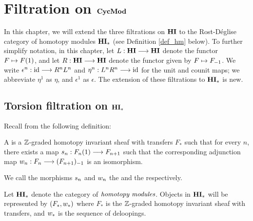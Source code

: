 \newpage
\chapter{Filtration on $\mathbf{CycMod}$}\label{sect_filtration_cycmod}

In this chapter, we will extend the three filtrations on
$\mathbf{HI}$ to the Rost-D\'eglise category of homotopy modules $\mathbf{HI}_*$ 
(see Definition \ref{def_hm} below). To further simplify notation, 
in this chapter, let $L: \mathbf{HI} \longrightarrow \mathbf{HI}$ denote the functor $F 
\mapsto F(1)$, and let $R: \mathbf{HI} \longrightarrow \mathbf{HI}$ denote the functor 
given by $F \mapsto F_{-1}$. We write $\epsilon^n : \mathrm{id} \longrightarrow 
R^nL^n$ and $\eta^n: L^nR^n \longrightarrow \mathrm{id}$ for the unit and counit maps; 
we abbreviate $\eta^1$ as $\eta$, and $\epsilon^1$ as $\epsilon$.
The extension of these filtrations to $\mathbf{HI}_*$ is new.

\section{Torsion filtration on $\mathbf{HI}_*$}
\label{sect_torsion_filt_HM}

Recall from \cite[1.17]{DegModHom} the following definition:

\begin{defn}\label{def_hm}
A  is a $\mathbb{Z}$-graded homotopy 
invariant sheaf with transfers $F_*$ such that for every $n$, 
there exists a map $s_n: F_n(1) \longrightarrow F_{n+1}$ such that the 
corresponding adjunction map $w_n: F_n \longrightarrow (F_{n+1})_{-1}$
is an isomorphism.

We call the morphisms $s_n$ and $w_n$ the  and the  respectively.

Let $\mathbf{HI}_*$ denote the category of $\emph{homotopy modules}$.
Objects in $\mathbf{HI}_*$ will be represented by $(F_*, w_*)$ where 
$F_*$ is the $\mathbb{Z}$-graded homotopy invariant sheaf with transfers, 
and $w_*$ is the sequence of deloopings.
\end{defn}

